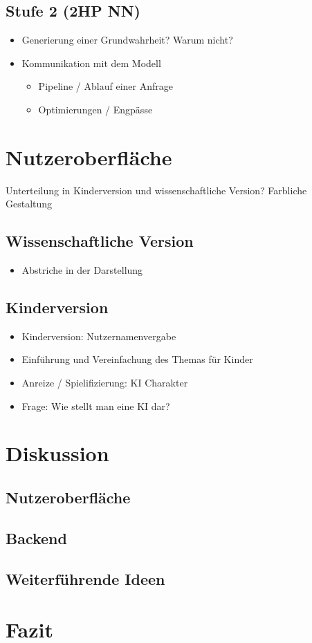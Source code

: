 \documentclass[a4paper]{extarticle}
\begin{document}
    \subsection{Stufe 2 (2HP NN)}
    \begin{itemize}
        \item Generierung einer Grundwahrheit? Warum nicht?
        \item Kommunikation mit dem Modell
        \begin{itemize}
            \item Pipeline / Ablauf einer Anfrage
            \item Optimierungen / Engpässe
        \end{itemize}
    \end{itemize}

    \section{Nutzeroberfläche}

    Unterteilung in Kinderversion und wissenschaftliche Version?
    Farbliche Gestaltung
    
    \subsection{Wissenschaftliche Version}
    \begin{itemize}
        \item Abstriche in der Darstellung
    \end{itemize}

    \subsection{Kinderversion}
    \begin{itemize}
        \item Kinderversion: Nutzernamenvergabe
        \item Einführung und Vereinfachung des Themas für Kinder 
        \item Anreize / Spielifizierung: KI Charakter
        \item Frage: Wie stellt man eine KI dar?
    \end{itemize}
    
    \section{Diskussion}
    \subsection{Nutzeroberfläche}
    \subsection{Backend}
    \subsection{Weiterführende Ideen}

    \section{Fazit}
    
\end{document}
